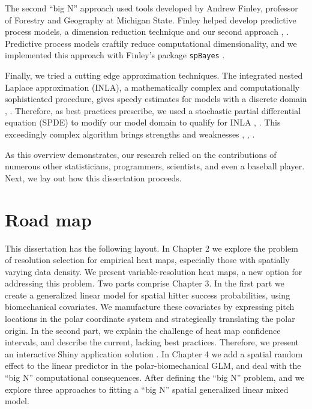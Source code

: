 The second ``big N'' approach used tools developed by Andrew Finley, professor of Forestry and Geography at Michigan State. Finley helped develop predictive process models, a dimension reduction technique and our second approach \citep{Banerjee2008}, \citep{Finley2012}. Predictive process models craftily reduce computational dimensionality, and we implemented this approach with Finley's package \verb|spBayes| \citep{Finley2013}.

Finally, we tried a cutting edge approximation techniques. The integrated nested Laplace approximation (INLA), a mathematically complex and computationally sophisticated procedure, gives speedy estimates for models with a discrete domain \citep{Rue2009}, \citep{Rue2005}. Therefore, as best practices prescribe, we used a stochastic partial differential equation (SPDE) to modify our model domain to qualify for INLA \citep{Lindgren2011}, \citep{Lindstrom2016}. This exceedingly complex algorithm brings strengths and weaknesses \citep{Mondal2017}, \citep{Simpson2012b}, \citep{Rue2009}.

As this overview demonstrates, our research relied on the contributions of numerous other statisticians, programmers, scientists, and even a baseball player. Next, we lay out how this dissertation proceeds.

\section{Road map}

This dissertation has the following layout. In Chapter 2 we explore the problem of resolution selection for empirical heat maps, especially those with spatially varying data density. We present variable-resolution heat maps, a new option for addressing this problem. Two parts comprise Chapter 3. In the first part we create a generalized linear model for spatial hitter success probabilities, using biomechanical covariates. We manufacture these covariates by expressing pitch locations in the polar coordinate system and strategically translating the polar origin. In the second part, we explain the challenge of heat map confidence intervals, and describe the current, lacking best practices. Therefore, we present an interactive Shiny application solution \citep{Shiny}. In Chapter 4 we add a spatial random effect to the linear predictor in the polar-biomechanical GLM, and deal with the ``big N'' computational consequences. After defining the ``big N'' problem, and we explore three approaches to fitting a ``big N'' spatial generalized linear mixed model. 
